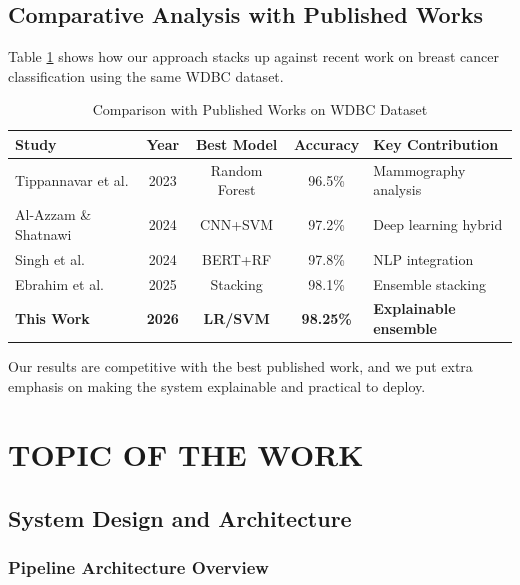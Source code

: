 \documentclass[12pt]{article}
\begin{document}
\subsection{Comparative Analysis with Published Works}

Table \ref{tab:literature_comparison} shows how our approach stacks up against recent work on breast cancer classification using the same WDBC dataset.

\begin{table}[H]
\centering
\caption{Comparison with Published Works on WDBC Dataset}
\label{tab:literature_comparison}
\small
\begin{tabular}{|p{3.5cm}|c|c|c|p{3cm}|}
\hline
\textbf{Study} & \textbf{Year} & \textbf{Best Model} & \textbf{Accuracy} & \textbf{Key Contribution} \\ \hline
Tippannavar et al. \cite{tippannavar2023} & 2023 & Random Forest & 96.5\% & Mammography analysis \\ \hline
Al-Azzam \& Shatnawi \cite{alazzam2024} & 2024 & CNN+SVM & 97.2\% & Deep learning hybrid \\ \hline
Singh et al. \cite{singh2024} & 2024 & BERT+RF & 97.8\% & NLP integration \\ \hline
Ebrahim et al. \cite{ebrahim2025} & 2025 & Stacking & 98.1\% & Ensemble stacking \\ \hline
\textbf{This Work} & \textbf{2026} & \textbf{LR/SVM} & \textbf{98.25\%} & \textbf{Explainable ensemble} \\ \hline
\end{tabular}
\end{table}

Our results are competitive with the best published work, and we put extra emphasis on making the system explainable and practical to deploy.

\newpage
\section{TOPIC OF THE WORK}

\subsection{System Design and Architecture}

\subsubsection{Pipeline Architecture Overview}
\end{document}
